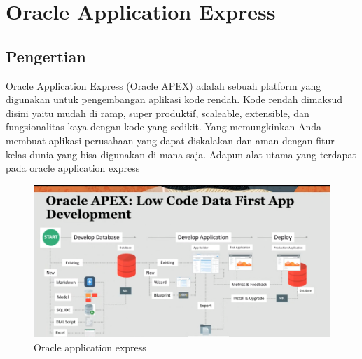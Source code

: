 \chapter{Oracle Application Express}
    \section{Pengertian}
        Oracle Application Express (Oracle APEX) adalah sebuah platform yang digunakan untuk pengembangan aplikasi kode rendah. Kode rendah dimaksud disini yaitu mudah di ramp, super produktif, scaleable, extensible, dan fungsionalitas kaya dengan kode yang sedikit. Yang memungkinkan Anda membuat aplikasi perusahaan yang dapat diskalakan dan aman dengan fitur kelas dunia yang bisa digunakan di mana saja. Adapun alat utama yang terdapat pada oracle application express
        \begin{figure}[!htbp]
        \centering
        \includegraphics[scale=0.6]{figures/1.PNG}
        \caption{Oracle application express}
    \end{figure}
